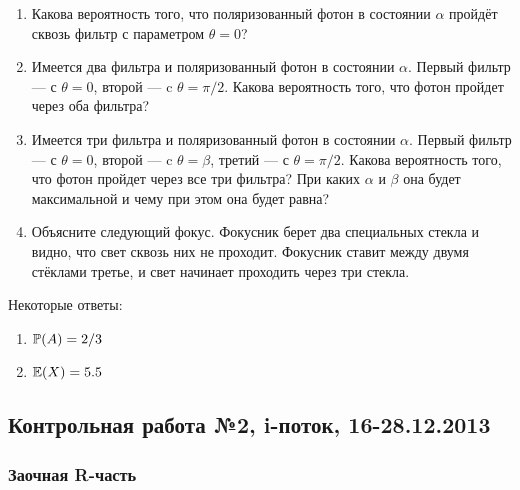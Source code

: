 \begin{enumerate}
\begin{enumerate}
\item Какова вероятность того, что поляризованный фотон в состоянии $\alpha$ пройдёт сквозь фильтр с параметром $\theta=0$?
\item Имеется два фильтра и поляризованный фотон в состоянии $\alpha$. Первый фильтр — с $\theta=0$, второй — c $\theta=\pi/2$. Какова вероятность того, что фотон пройдет через оба фильтра?
\item Имеется три фильтра и поляризованный фотон в состоянии $\alpha$. Первый фильтр — с $\theta=0$, второй — c $\theta=\beta$, третий — с $\theta=\pi/2$. Какова вероятность того, что фотон пройдет через все три фильтра? При каких $\alpha$ и $\beta$ она будет максимальной и чему при этом она будет равна?
\item Объясните следующий фокус. Фокусник берет два специальных стекла и видно, что свет сквозь них не проходит. Фокусник ставит между двумя стёклами третье, и свет начинает проходить через три стекла.
\end{enumerate}


\end{enumerate}

Некоторые ответы:
\begin{enumerate}
\item $\P(A)=2/3$
\item $\E(X)=5.5$
\end{enumerate}


\subsection{Контрольная работа №2, i-поток, 16-28.12.2013}

\subsubsection*{Заочная R-часть}

